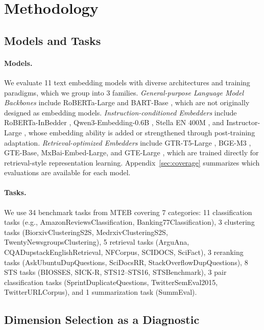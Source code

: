 \documentclass[11pt]{article}
\begin{document}
\section{Methodology}
\label{sec:method}
\subsection{Models and Tasks}
\paragraph{Models.}
We evaluate 11 text embedding models with diverse architectures and training paradigms, which we group into 3 families. \emph{General-purpose Language Model Backbones} include RoBERTa-Large \citep{roberta} and BART-Base \citep{bart}, which are not originally designed as embedding models. \emph{Instruction-conditioned Embedders} include RoBERTa-InBedder \citep{inbedder}, Qwen3-Embedding-0.6B \citep{qwen3-embedding}, Stella EN 400M \citep{stella}, and Instructor-Large \citep{instructor}, whose embedding ability is added or strengthened through post-training adaptation. \emph{Retrieval-optimized Embedders} include GTR-T5-Large \citep{gtr}, BGE-M3 \citep{bge}, GTE-Base, MxBai-Embed-Large, and GTE-Large \citep{gte}, which are trained directly for retrieval-style representation learning. Appendix~\ref{sec:coverage} summarizes which evaluations are available for each model.

\paragraph{Tasks.}
We use 34 benchmark tasks from MTEB \citep{mteb} covering 7 categories:
11 classification tasks (e.g., AmazonReviewsClassification, Banking77Classification),
3 clustering tasks (BiorxivClusteringS2S, MedrxivClusteringS2S, TwentyNewsgroupsClustering),
5 retrieval tasks (ArguAna, CQADupstackEnglishRetrieval, NFCorpus, SCIDOCS, SciFact),
3 reranking tasks (AskUbuntuDupQuestions, SciDocsRR, StackOverflowDupQuestions),
8 STS tasks (BIOSSES, SICK-R, STS12--STS16, STSBenchmark),
3 pair classification tasks (SprintDuplicateQuestions, TwitterSemEval2015, TwitterURLCorpus), and
1 summarization task (SummEval).

\subsection{Dimension Selection as a Diagnostic}
\end{document}
